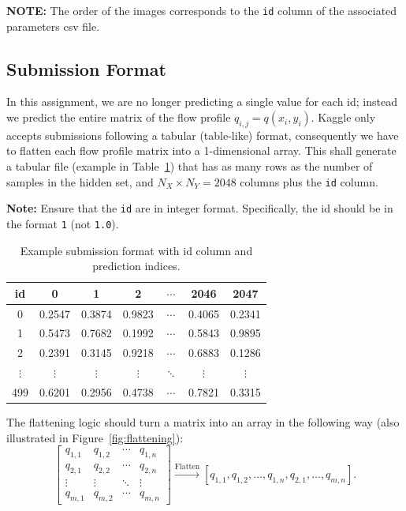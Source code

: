 \documentclass[11pt,a4paper]{article}
\begin{document}
\noindent\textbf{NOTE:} The order of the images corresponds to the \texttt{id} column of the associated parameters csv file.

\subsection{Submission Format}

In this assignment, we are no longer predicting a single value for each id; instead we predict the entire matrix of the flow profile \(q_{i,j} = q(x_i,y_i)\). Kaggle only accepts submissions following a tabular (table-like) format, consequently we have to flatten each flow profile matrix into a 1-dimensional array. This shall generate a tabular file (example in Table~\ref{tab:submission}) that has as many rows as the number of samples in the hidden set, and \(N_X \times N_Y = 2048\) columns plus the \texttt{id} column.

\medskip
\noindent\textbf{Note:} Ensure that the \texttt{id} are in integer format. Specifically, the id should be in the format \texttt{1} (not \texttt{1.0}).

\begin{table}[H]
    \centering
    \caption{Example submission format with id column and prediction indices.}
    \label{tab:submission}
    \begin{tabular}{c c c c c c c}
        \toprule
        id & 0 & 1 & 2 & \(\cdots\) & 2046 & 2047 \\
        \midrule
        0   & 0.2547 & 0.3874 & 0.9823 & \(\cdots\) & 0.4065 & 0.2341 \\
        1   & 0.5473 & 0.7682 & 0.1992 & \(\cdots\) & 0.5843 & 0.9895 \\
        2   & 0.2391 & 0.3145 & 0.9218 & \(\cdots\) & 0.6883 & 0.1286 \\
        \(\vdots\) & \(\vdots\) & \(\vdots\) & \(\vdots\) & \(\ddots\) & \(\vdots\) & \(\vdots\) \\
        499 & 0.6201 & 0.2956 & 0.4738 & \(\cdots\) & 0.7821 & 0.3315 \\
        \bottomrule
    \end{tabular}
\end{table}

The flattening logic should turn a matrix into an array in the following way (also illustrated in Figure~\ref{fig:flattening}):
\begin{equation}
\begin{bmatrix}
q_{1,1} & q_{1,2} & \cdots & q_{1,n}\\
q_{2,1} & q_{2,2} & \cdots & q_{2,n}\\
\vdots & \vdots & \ddots & \vdots\\
q_{m,1} & q_{m,2} & \cdots & q_{m,n}
\end{bmatrix}
\overset{\text{Flatten}}{\longrightarrow}
[q_{1,1}, q_{1,2}, \ldots, q_{1,n}, q_{2,1}, \ldots, q_{m,n}] .
\end{equation}
\end{document}
